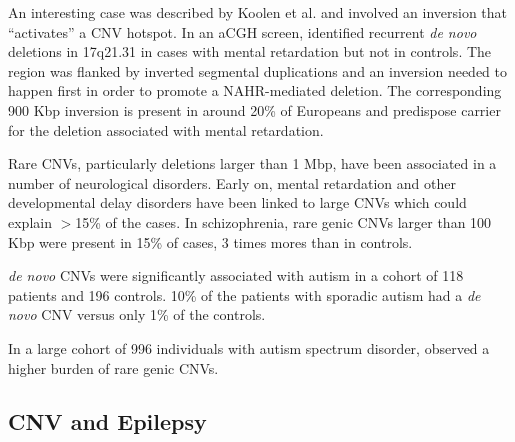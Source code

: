 An interesting case was described by Koolen et al. and involved an inversion that ``activates'' a CNV hotspot\cite{Koolen2006}.
In an aCGH screen, \citet{Koolen2006} identified recurrent {\it de novo} deletions in 17q21.31 in cases with mental retardation but not in controls.
The region was flanked by inverted segmental duplications and an inversion needed to happen first in order to promote a NAHR-mediated deletion.
The corresponding 900 Kbp inversion is present in around 20\% of Europeans and predispose carrier for the deletion associated with mental retardation.

Rare CNVs, particularly deletions larger than 1 Mbp, have been associated in a number of neurological disorders.
Early on, mental retardation and other developmental delay disorders have been linked to large CNVs which could explain $>$15\% of the cases\cite{Mefford2009}.
In schizophrenia, rare genic CNVs larger than 100 Kbp were present in 15\% of cases, 3 times mores than in controls\cite{Walsh2008}.
\begin{comment}
  This study used aCGH on 150 cases and 268 ancestry-matched controls defining novel/rare CNVs if absent from DGV.
  The association was replicated in another cohort with early onset schizophrenia.
  Overall they saw no difference in burden for common CNVs ($>$1\%).
\end{comment}
{\it de novo} CNVs were significantly associated with autism in a cohort of 118 patients and 196 controls\cite{Sebat2007}.
10\% of the patients with sporadic autism had a {\it de novo} CNV versus only 1\% of the controls.
\begin{comment}
  {\it de novo} CNV candidates were selected if present in the proband but not in all the parents in the cohort.
  {\it de novo} candidates were thoroughly investigated to ensure that parents were not carrier, correct paternity, no platform or DNA protocol effect.
\end{comment}
In a large cohort of 996 individuals with autism spectrum disorder, \citet{Pinto2010} observed a higher burden of rare genic CNVs.
\begin{comment}
  They found a 1.19 fold enrichment compared to their 1,287 matched controls.
  Several {\it de novo} and inherited variants were used to identify new candidate genes.
\end{comment}


\subsection{CNV and Epilepsy}

